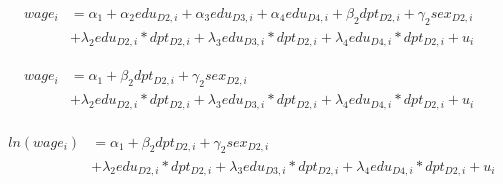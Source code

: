 \documentclass[12pt,(landscape,a4paper),(portrait,a4paper)]{article}
\theoremstyle{definition}
\theoremstyle{definition}
\theoremstyle{definition}
\theoremstyle{remark}
\begin{document}
\[\begin{equation}
\begin{split}
wage_i & =\alpha_1+\alpha_2edu_{D2,i}+\alpha_3edu_{D3,i}+\alpha_4edu_{D4,i}+\beta_2 dpt_{D2,i}+\gamma_2sex_{D2,i}
\\ & +\lambda_2edu_{D2,i} \ast dpt_{D2,i}+\lambda_3edu_{D3,i}\ast dpt_{D2,i} +\lambda_4edu_{D4,i}\ast dpt_{D2,i}+u_i  
\end{split}
\label{eq:only-prod} 
\end{equation}\]

\begin{align}
\begin{split}
wage_i & =\alpha_1+\beta_2 dpt_{D2,i}+\gamma_2sex_{D2,i}  \\
& +\lambda_2edu_{D2,i} \ast dpt_{D2,i}+\lambda_3edu_{D3,i}\ast dpt_{D2,i} +\lambda_4edu_{D4,i}\ast dpt_{D2,i}+u_i 
\end{split}
\label{eq:only-prod-part} 
\end{align}

\begin{align}
\begin{split}
ln(wage_i) & =\alpha_1+\beta_2 dpt_{D2,i}+\gamma_2sex_{D2,i} \\
& +\lambda_2edu_{D2,i} \ast dpt_{D2,i}+\lambda_3edu_{D3,i}\ast dpt_{D2,i}+\lambda_4edu_{D4,i}\ast dpt_{D2,i} +u_i 
\end{split}
\label{eq:only-prod-log-part} 
\end{align}
\end{document}
